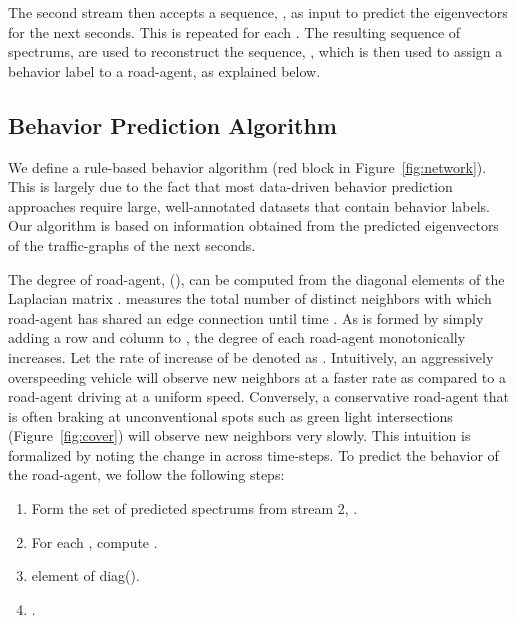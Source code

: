 \documentclass[10pt,twocolumn,letterpaper]{article}
\theoremstyle{plain}
\begin{document}
The second stream then accepts a sequence, , as input to predict the  eigenvectors for the next  seconds. This is repeated for each . The resulting sequence of spectrums,  are used to reconstruct the sequence, , which is then used to assign a behavior label to a road-agent, as explained below.

\subsection{Behavior Prediction Algorithm}
\label{subsec: behavior_protocol}
We define a rule-based behavior algorithm (red block in Figure~\ref{fig:network}). This is largely due to the fact that most data-driven behavior prediction approaches require large, well-annotated datasets that contain behavior labels. Our algorithm is based on information obtained from the predicted eigenvectors of the traffic-graphs of the next  seconds.



The degree of  road-agent, (), can be computed from the diagonal elements of the Laplacian matrix .  measures the total number of distinct neighbors with which road-agent  has shared an edge connection until time . As  is formed by simply adding a row and column to , the degree of each road-agent monotonically increases. Let the rate of increase of  be denoted as . Intuitively, an aggressively overspeeding vehicle will observe new neighbors at a faster rate as compared to a road-agent driving at a uniform speed. Conversely, a conservative road-agent that is often braking at unconventional spots such as green light intersections (Figure~\ref{fig:cover}) will observe new neighbors very slowly. This intuition is formalized by noting the change in  across time-steps. To predict the behavior of the  road-agent, we follow the following steps:

\begin{enumerate}[noitemsep]
    \item Form the set of predicted spectrums from stream 2, .
    \item For each , compute .
    \item  element of diag().
    \item .
\end{enumerate}
\end{document}
